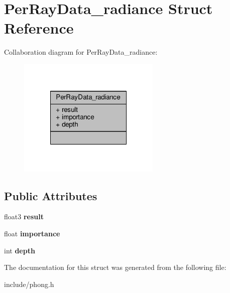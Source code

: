 \hypertarget{struct_per_ray_data__radiance}{\section{Per\-Ray\-Data\-\_\-radiance Struct Reference}
\label{struct_per_ray_data__radiance}
}


Collaboration diagram for Per\-Ray\-Data\-\_\-radiance\-:
\nopagebreak
\begin{figure}[H]
\begin{center}
\leavevmode
\includegraphics[width=192pt]{struct_per_ray_data__radiance__coll__graph}
\end{center}
\end{figure}
\subsection*{Public Attributes}
\begin{DoxyCompactItemize}
\item 
\hypertarget{struct_per_ray_data__radiance_a1524fc04835143d418d518d3e6d04af3}{float3 {\bfseries result}}\label{struct_per_ray_data__radiance_a1524fc04835143d418d518d3e6d04af3}

\item 
\hypertarget{struct_per_ray_data__radiance_aa1b5787214bf0fd68fd4fc6e83862001}{float {\bfseries importance}}\label{struct_per_ray_data__radiance_aa1b5787214bf0fd68fd4fc6e83862001}

\item 
\hypertarget{struct_per_ray_data__radiance_a1da01f95cd36562f96e8d8dbb12b215f}{int {\bfseries depth}}\label{struct_per_ray_data__radiance_a1da01f95cd36562f96e8d8dbb12b215f}

\end{DoxyCompactItemize}


The documentation for this struct was generated from the following file\-:\begin{DoxyCompactItemize}
\item 
include/phong.\-h\end{DoxyCompactItemize}
